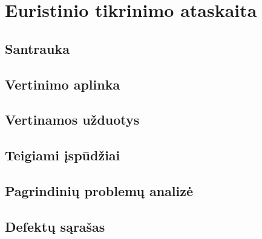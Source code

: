\section{Euristinio tikrinimo ataskaita}

\subsection{Santrauka}
	
\subsection{Vertinimo aplinka}
	
\subsection{Vertinamos užduotys}
	
\subsection{Teigiami įspūdžiai}
	
\subsection{Pagrindinių problemų analizė}
	
\subsection{Defektų sąrašas}
	